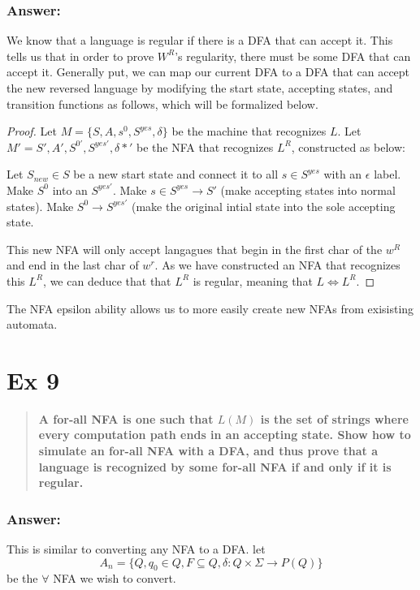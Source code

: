 \documentclass[titlepage]{article}\usepackage[]{graphicx}\usepackage[]{color}
\begin{document}
\subsubsection{Answer:}
We know that a language is regular if there is a DFA that can accept it. This
tells us that in order to prove $W^R$'s regularity, there must be some DFA that
can accept it. Generally put, we can map our current DFA to a DFA that can
accept the new reversed language by modifying the start state, accepting
states, and transition functions as follows, which will be formalized below.

\begin{proof} 
	Let $M = \{S, A, s^0, S^{yes}, \delta\}$ be the machine that recognizes $L$.
	Let $M' = {S',A',S^{0'}, S^{yes'}, \delta*'}$ be the NFA that recognizes
	$L^R$, constructed as below:

	Let $S_{new} \in S$ be a new start state and connect it to all $s \in S^{yes}$
	with an $\epsilon$ label. 
	Make $S^0$ into an $S^{yes'}$. 
	Make $s \in S^{yes} \to S'$ (make accepting states into normal states).
	Make $S^{0} \to S^{yes'}$ (make the original intial state into the sole
	accepting state.

	This new NFA will only accept langagues that begin in the first char of the
	$w^R$ and end in the last char of $w^r$. As we have constructed an NFA that
	recognizes this $L^R$, we can deduce that that $L^R$ is regular, meaning
	that $L \Leftrightarrow L^R$.
\end{proof}

The NFA epsilon ability allows us to more easily create new NFAs from
exisisting automata.



\section*{Ex 9}
\begin{quote}
  \textbf{A for-all NFA is one such that $L(M)$ is the set of strings where every
  computation path ends in an accepting state. Show how to simulate an for-all
  NFA with a DFA, and thus prove that a language is recognized by some for-all
  NFA if and only if it is regular.}
\end{quote}

\subsubsection*{Answer:}
This is similar to converting any NFA to a DFA. 
let \[ A_n = \{ Q, q_0 \in Q, F \subseteq Q, \delta : Q \times \Sigma \to P(Q) \} \]
  be the $\forall$ NFA we wish to convert.
\end{document}
